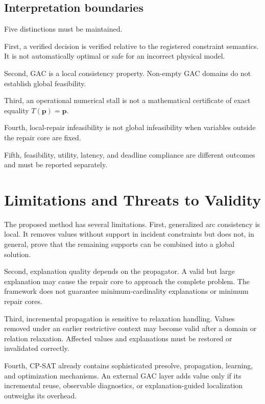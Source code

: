 \documentclass[pdflatex,sn-mathphys-num,iicol,oneside]{sn-jnl}
\begin{document}
\subsection{Interpretation boundaries}

Five distinctions must be maintained.

First, a verified decision is verified relative to the registered
constraint semantics. It is not automatically optimal or safe for an
incorrect physical model.

Second, GAC is a local consistency property. Non-empty GAC domains do
not establish global feasibility.

Third, an operational numerical stall is not a mathematical
certificate of exact equality $T(\bm{p})=\bm{p}$.

Fourth, local-repair infeasibility is not global infeasibility when
variables outside the repair core are fixed.

Fifth, feasibility, utility, latency, and deadline compliance are
different outcomes and must be reported separately.

\section{Limitations and Threats to Validity}
\label{sec:limitations}

The proposed method has several limitations. First, generalized arc consistency is local. It removes values without
support in incident constraints but does not, in general, prove that
the remaining supports can be combined into a global solution.

Second, explanation quality depends on the propagator. A valid but
large explanation may cause the repair core to approach the complete
problem. The framework does not guarantee minimum-cardinality
explanations or minimum repair cores.

Third, incremental propagation is sensitive to relaxation handling.
Values removed under an earlier restrictive context may become valid
after a domain or relation relaxation. Affected values and explanations
must be restored or invalidated correctly.

Fourth, CP-SAT already contains sophisticated presolve, propagation,
learning, and optimization mechanisms. An external GAC layer adds
value only if its incremental reuse, observable diagnostics, or
explanation-guided localization outweighs its overhead.
\end{document}
